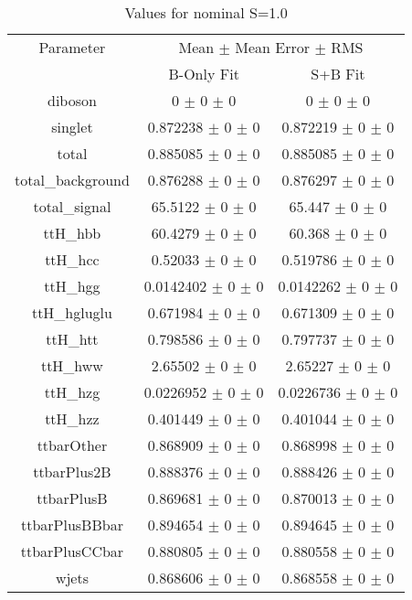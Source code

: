 \begin{table}
\centering
\caption{Values for nominal S=1.0}
\begin{tabular}{ccc}
\toprule
Parameter 	& \multicolumn{2}{c}{Mean $\pm$ Mean Error $\pm$ RMS}\\
 	& B-Only Fit & S+B Fit\\
\midrule
diboson 	& \num{0} $\pm$ \num{0} $\pm$ \num{0} 	& \num{0} $\pm$ \num{0} $\pm$ \num{0}\\
singlet 	& \num{0.872238} $\pm$ \num{0} $\pm$ \num{0} 	& \num{0.872219} $\pm$ \num{0} $\pm$ \num{0}\\
total 	& \num{0.885085} $\pm$ \num{0} $\pm$ \num{0} 	& \num{0.885085} $\pm$ \num{0} $\pm$ \num{0}\\
total\_background 	& \num{0.876288} $\pm$ \num{0} $\pm$ \num{0} 	& \num{0.876297} $\pm$ \num{0} $\pm$ \num{0}\\
total\_signal 	& \num{65.5122} $\pm$ \num{0} $\pm$ \num{0} 	& \num{65.447} $\pm$ \num{0} $\pm$ \num{0}\\
ttH\_hbb 	& \num{60.4279} $\pm$ \num{0} $\pm$ \num{0} 	& \num{60.368} $\pm$ \num{0} $\pm$ \num{0}\\
ttH\_hcc 	& \num{0.52033} $\pm$ \num{0} $\pm$ \num{0} 	& \num{0.519786} $\pm$ \num{0} $\pm$ \num{0}\\
ttH\_hgg 	& \num{0.0142402} $\pm$ \num{0} $\pm$ \num{0} 	& \num{0.0142262} $\pm$ \num{0} $\pm$ \num{0}\\
ttH\_hgluglu 	& \num{0.671984} $\pm$ \num{0} $\pm$ \num{0} 	& \num{0.671309} $\pm$ \num{0} $\pm$ \num{0}\\
ttH\_htt 	& \num{0.798586} $\pm$ \num{0} $\pm$ \num{0} 	& \num{0.797737} $\pm$ \num{0} $\pm$ \num{0}\\
ttH\_hww 	& \num{2.65502} $\pm$ \num{0} $\pm$ \num{0} 	& \num{2.65227} $\pm$ \num{0} $\pm$ \num{0}\\
ttH\_hzg 	& \num{0.0226952} $\pm$ \num{0} $\pm$ \num{0} 	& \num{0.0226736} $\pm$ \num{0} $\pm$ \num{0}\\
ttH\_hzz 	& \num{0.401449} $\pm$ \num{0} $\pm$ \num{0} 	& \num{0.401044} $\pm$ \num{0} $\pm$ \num{0}\\
ttbarOther 	& \num{0.868909} $\pm$ \num{0} $\pm$ \num{0} 	& \num{0.868998} $\pm$ \num{0} $\pm$ \num{0}\\
ttbarPlus2B 	& \num{0.888376} $\pm$ \num{0} $\pm$ \num{0} 	& \num{0.888426} $\pm$ \num{0} $\pm$ \num{0}\\
ttbarPlusB 	& \num{0.869681} $\pm$ \num{0} $\pm$ \num{0} 	& \num{0.870013} $\pm$ \num{0} $\pm$ \num{0}\\
ttbarPlusBBbar 	& \num{0.894654} $\pm$ \num{0} $\pm$ \num{0} 	& \num{0.894645} $\pm$ \num{0} $\pm$ \num{0}\\
ttbarPlusCCbar 	& \num{0.880805} $\pm$ \num{0} $\pm$ \num{0} 	& \num{0.880558} $\pm$ \num{0} $\pm$ \num{0}\\
wjets 	& \num{0.868606} $\pm$ \num{0} $\pm$ \num{0} 	& \num{0.868558} $\pm$ \num{0} $\pm$ \num{0}\\
\bottomrule
\end{tabular}
\end{table}